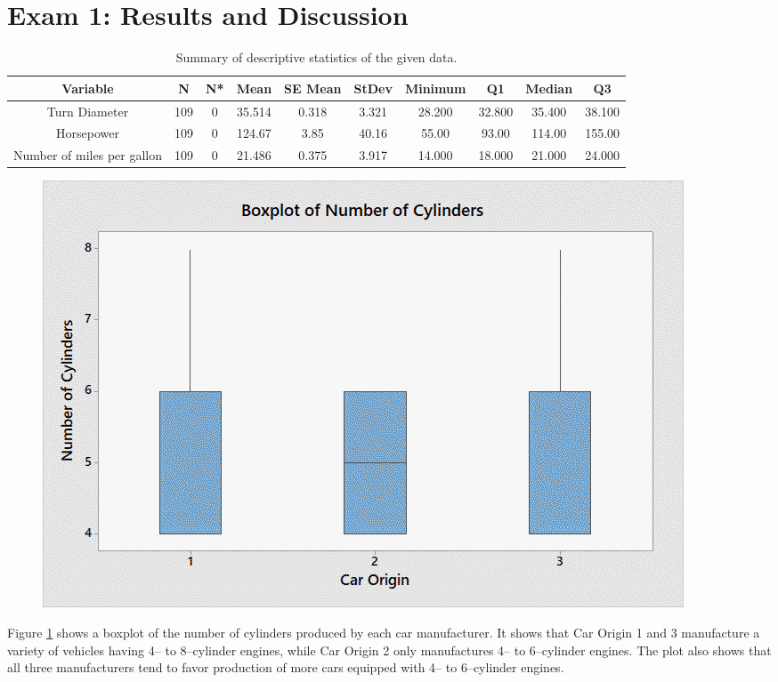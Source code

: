 \documentclass[10pt,a4paper]{article}
\begin{document}
\setcounter{page}{1}

\section*{Exam 1: Results and Discussion}

\begin{table}
	\centering
	\caption{Summary of descriptive statistics of the given data.}
	\begin{tabular}{c|ccccccccc}
Variable & N & N*	& Mean	& SE Mean	& StDev	& Minimum	& Q1	& Median	& Q3 \\ \hline \hline
Turn Diameter	& 109	& 0	& 35.514	& 0.318	& 3.321	& 28.200	& 32.800	& 35.400	& 38.100 \\
Horsepower	& 109	& 0	& 124.67	& 3.85	& 40.16	& 55.00	& 93.00	& 114.00	& 155.00 \\
Number of miles per gallon	& 109	& 0	& 21.486	& 0.375	& 3.917	& 14.000	& 18.000	& 21.000	& 24.000
	\end{tabular}
	\label{tab:summary}
\end{table}

\begin{figure}[tb]
	\centering
	\includegraphics[width=0.75\linewidth]{box-cyl_vs_orig.png}
	\caption{}
	\label{fig:cyl-vs-orig}
\end{figure}

Figure \ref{fig:cyl-vs-orig} shows a boxplot of the number of cylinders produced by each car manufacturer. It shows that Car Origin 1 and 3 manufacture a variety of vehicles having 4-- to 8--cylinder engines, while Car Origin 2 only manufactures 4-- to 6--cylinder engines. The plot also shows that all three manufacturers tend to favor production of more cars equipped with 4-- to 6--cylinder engines.
\end{document}
